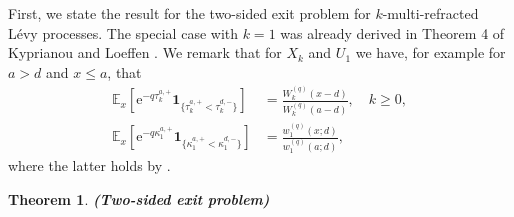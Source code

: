 \documentclass[12pt,reqno]{amsart}
\newtheorem{theorem}{Theorem}
\theoremstyle{definition}
\theoremstyle{remark}
\newcommand{\e}{\mathbb{E}}
\newcommand{\ind}{\mathbf{1}}
\newcommand{\wq}{w^{(q)}}
\begin{document}
First, we state the result for the two-sided exit problem for $k$-multi-refracted L\'evy processes.
The special case with $k=1$ was already derived in Theorem 4 of  Kyprianou and Loeffen \cite{kyprianouloeffen2010}. 
We remark that for $X_k$ and $U_1$ we have, for example for $a > d$ and $x \leq a$, that
\begin{align}
\e_x \left[ \mathrm{e}^{-q \tau_k^{a,+}} \ind_{\{\tau_k^{a,+}< \tau_k^{d,-}\}} \right] &= \frac{W_k^{(q)}(x-d)}{W_k^{(q)}(a-d)},  \quad k \geq 0,\\ \label{two-sided_kypr&loeffen}
\e_x \left[ \mathrm{e}^{-q \kappa_1^{a,+}} \ind_{\{\kappa_1^{a,+}< \kappa_1^{d,-}\}} \right] &= \frac{\wq_1(x;d)}{\wq_1(a;d)} ,
\end{align}
where the latter holds by \cite{kyprianouloeffen2010}.

\begin{theorem}{\textbf{(Two-sided exit problem)}}\label{th:mr.recursion}


\end{theorem}
\end{document}
